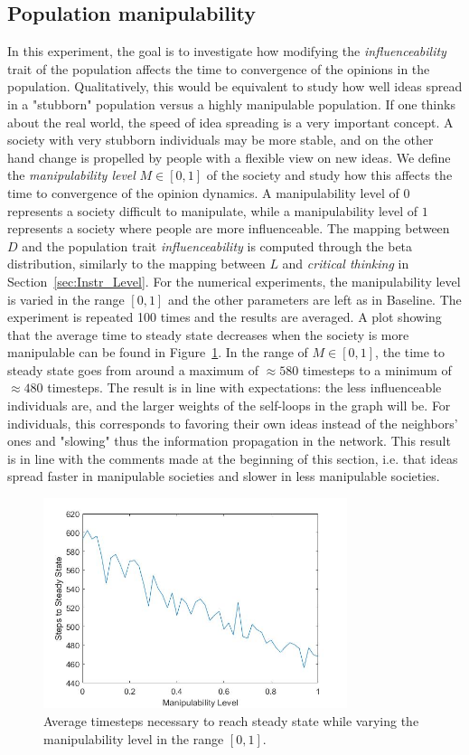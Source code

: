 \subsection{Population manipulability}
\label{sec:manipulability}
In this experiment, the goal is to investigate how modifying the \textit{influenceability} trait of the population affects the time to convergence of the opinions in the population. Qualitatively, this would be equivalent to study how well ideas spread in a "stubborn" population versus a highly manipulable population. If one thinks about the real world, the speed of idea spreading is a very important concept. A society with very stubborn individuals may be more stable, and on the other hand change is propelled by people with a flexible view on new ideas.
We define the \textit{manipulability level} $M \in [0,1]$ of the society and study how this affects the time to convergence of the opinion dynamics. A manipulability level of $0$ represents a society difficult to manipulate, while a manipulability level of $1$ represents a society where people are more influenceable. The mapping between $D$ and the population trait \textit{influenceability} is computed through the beta distribution, similarly to the mapping between $L$ and \textit{critical thinking} in Section~\ref{sec:Instr_Level}. For the numerical experiments, the manipulability level is varied in the range $[0,1]$ and the other parameters are left as in Baseline. The experiment is repeated 100 times and the results are averaged. A plot showing that the average time to steady state decreases when the society is more manipulable can be found in Figure~\ref{pics:man_steadystate}. In the range of $M\in [0,1]$, the time to steady state goes from around a maximum of $\approx 580$ timesteps to a minimum of $\approx 480$ timesteps. The result is in line with expectations: the less influenceable individuals are, and the larger weights of the self-loops in the graph will be. For individuals, this corresponds to favoring their own ideas instead of the neighbors' ones and "slowing" thus the information propagation in the network.
This result is in line with the comments made at the beginning of this section, i.e. that ideas spread faster in manipulable societies and slower in less manipulable societies.
\begin{figure}[!t]
	\centering
	\includegraphics[width=3.5in]{Figures/exp8_final.jpg}
	\caption{Average timesteps necessary to reach steady state while varying the manipulability level in the range $[0,1]$.}
\label{pics:man_steadystate}
\end{figure}


